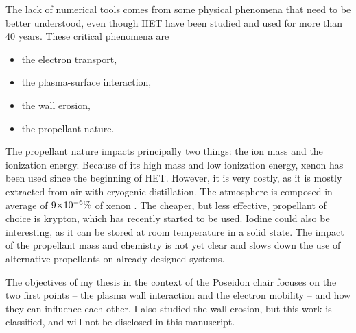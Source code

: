 The lack of numerical tools comes from some physical phenomena that need to be better understood, even though \ac{HET} have been studied and used for more than 40 years.
These critical phenomena are \citep{samukawa2012,adamovich2017}
\begin{itemize}
  \item the electron transport,
  \item the plasma-surface interaction,
  \item the wall erosion,
  \item the propellant nature.
\end{itemize}

\vspace{1em}
The propellant nature impacts principally two things\string: the ion mass and the ionization energy.
Because of its high mass and low ionization energy, xenon has been used since the beginning of \ac{HET}. 
However, it is very costly, as it is mostly extracted from air with cryogenic distillation.
The atmosphere is composed in average of ${{9}{\times}10^{-6}}\%$ of xenon \citep{earthfacs}.
The cheaper, but less effective, propellant of choice is krypton, which has recently started to be used.
Iodine could also be interesting, as it can be stored at room temperature in a solid state.
The impact of the propellant mass and chemistry is not yet clear and slows down the use of alternative propellants on already designed systems.

\vspace{1em}
The objectives of my thesis in the context of the {\sc Poseidon} chair focuses on the two first points -- the plasma wall interaction and the electron mobility -- and how they can influence each-other.
I also studied the wall erosion, but this work is classified, and will not be disclosed in this manuscript.





